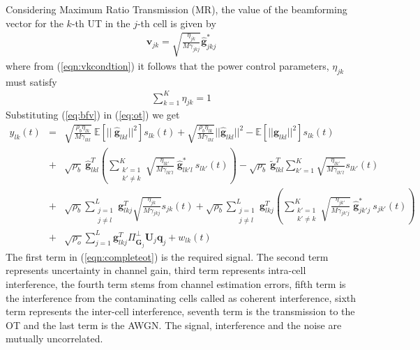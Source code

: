 \documentclass[10pt, a4paper, twoside,fleqn]{article}
\begin{document}
 Considering Maximum Ratio Transmission (MR), the value of the beamforming vector for the $k$-th UT in the $j$-th cell is given by
\begin{eqnarray}\label{eq:bfv}
	\pmb{v}_{jk} = \sqrt{\frac{\eta_{jk}}{M\gamma_{jkj}}}\pmb{\hat g}^*_{jkj}
\end{eqnarray}
where from (\ref{eqn:vkcondtion}) it follows that the power control parameters, $\eta_{jk}$ must satisfy
\begin{eqnarray}\label{eqn:etaconstraint}
\sum\limits_{k=1}^{K}\eta_{jk}=1
\end{eqnarray}
Substituting (\ref{eq:bfv}) in (\ref{eq:ot}) we get
\begin{eqnarray} \label{eqn:completeot}
	y_{lk}(t)  &=& \sqrt{\frac{\rho_b\eta_{lk}}{M\gamma_{lkl}}} \ \mathbb{E}[|| \ \pmb{\hat g}_{lkl}||^2]s_{lk}(t)
	           +  \sqrt{\frac{\rho_b\eta_{lk}}{M\gamma_{lkl}}}||\pmb{\hat g}_{lkl}||^2 - \mathbb{E}[||\pmb{\hat g}_{lkl}||^2]s_{lk}(t)  \nonumber \\
	           &+& \sqrt{\rho_b} \ \pmb{\hat g}_{lkl}^T \left(\sum_{\substack{k'=1 \\ k' \neq k}}^{K} \sqrt{\frac{\eta_{lk'}}{M\gamma_{lk'l}}} \ \pmb{\hat g}^*_{lk'l} \ s_{lk'} (t)\right)
	           - \sqrt{\rho_b}\ \pmb{\widetilde g}^T_{lkl}\sum\limits_{k'=1}^{K}\sqrt{\frac{\eta_{lk'}}{M\gamma_{lk'l}}}s_{lk'}(t) \nonumber \\
	           &+& \sqrt{\rho_b}\sum\limits_{\substack{j=1 \\ j\neq l}}^{L}\pmb{g}^T_{lkj}\sqrt{\frac{\eta_{jk}}{M\gamma_{jkj}}}s_{jk}(t)
               + \sqrt{\rho_b} \sum_{\substack{j=1 \\ j \neq l}}^{L} \pmb{g}_{lkj}^T \left(\sum_{\substack{k'=1 \\ k' \neq k}}^{K} \sqrt{\frac{\eta_{jk'}}{M\gamma_{jk'j}}} \ \pmb{\hat g}^*_{jk'j} \ s_{jk'} (t)\right)
               \nonumber \\
               &+& \sqrt{\rho_o}\sum_{j=1}^{L}\pmb{g}^T_{lkj} \Pi^{\perp}_{\pmb{\hat{G}}_j} \pmb{U}_j \pmb{q}_{j}
               + w_{lk}(t)      
\end{eqnarray}
The first term in (\ref{eqn:completeot}) is the required signal. The second term represents uncertainty in channel gain, third term represents intra-cell interference, the fourth term stems from channel estimation errors, fifth term is the  interference from the contaminating cells called as coherent interference, sixth term represents the inter-cell interference, seventh term is the transmission to the OT and the last term is the AWGN. The signal, interference and the noise are mutually uncorrelated.
\end{document}
